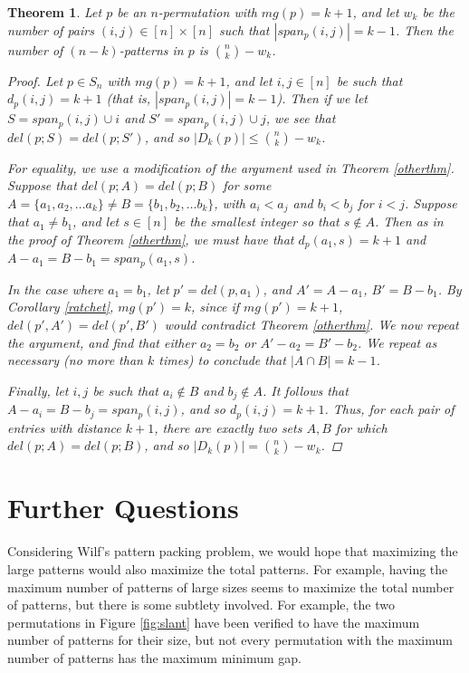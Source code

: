 \documentclass[11pt]{article}
\theoremstyle{plain}
\newtheorem{thm}{Theorem}
\theoremstyle{definition}
\begin{document}
  \begin{thm} \label{final} 
  Let $p$ be an $n$-permutation with $mg(p) = k+1$, and let $w_k$ be the
  number of pairs $(i,j) \in [n] \times [n]$ such that $|span_p(i,j)| = k-1$. Then
  the number of $(n-k)$-patterns in $p$ is $\binom{n}{k} - w_k$.  \begin{proof}
  Let $p \in S_n$ with $mg(p) = k+1$, and let $i,j \in [n]$ be such that
  $d_p(i,j) = k+1$ (that is, $|span_p(i,j)| = k-1$). Then if we let $S =
  span_p(i,j) \cup i$ and $S' = span_p(i,j) \cup j$, we see that $del(p;S) =
  del(p;S')$, and so $|D_k(p)| \leq \binom{n}{k} - w_k$. 

  For equality, we use a modification of the argument used in Theorem
  \ref{otherthm}. Suppose that $del(p;A) = del(p;B)$ for some $A = \{a_1, a_2,
  \ldots a_k\} \not = B = \{b_1, b_2, \ldots b_k\}$, with $a_i < a_j$ and $b_i <
  b_j$ for $i<j$. Suppose that $a_1 \not = b_1$, and let $s\in[n]$ be the smallest
  integer so that $s \notin A$. Then as in the proof of Theorem \ref{otherthm}, we
  must have that $d_p(a_1,s) = k+1$ and $A-a_1 = B-b_1 = span_p(a_1,s)$. 

  In the case where $a_1 = b_1$, let $p' = del(p,a_1)$, and $A'=A-a_1$, $B' =
  B-b_1$. By Corollary \ref{ratchet}, $mg(p') =k$, since if $mg(p') =
  k+1$, $del(p',A') = del(p',B')$ would contradict Theorem \ref{otherthm}. We now
  repeat the argument, and find that either $a_2 = b_2$ or $A'-a_2 = B'-b_2$. We
  repeat as necessary (no more than $k$ times) to conclude that $|A\cap B| = k-1$. 

  Finally, let $i,j$ be such that $a_i \notin B$ and $b_j \notin A$. It follows
  that $A-a_i = B-b_j = span_p(i,j)$, and so $d_p(i,j) = k+1$. Thus, for each pair
  of entries with distance $k+1$, there are exactly two sets $A,B$ for which
  $del(p;A) = del(p;B)$, and so $|D_k(p)| = \binom{n}{k} - w_k$.  
  \end{proof}
  \end{thm}






\section{Further Questions}

  Considering Wilf's pattern packing problem, we would hope that maximizing the
  large patterns would also maximize the total patterns. For example, having the
  maximum number of patterns of large sizes seems to maximize the total number of
  patterns, but there is some subtlety involved. For example, the two permutations
  in Figure \ref{fig:slant} have been verified to have the maximum number of patterns
  for their size, but not every permutation with the maximum number of patterns
  has the maximum minimum gap. 
\end{document}

